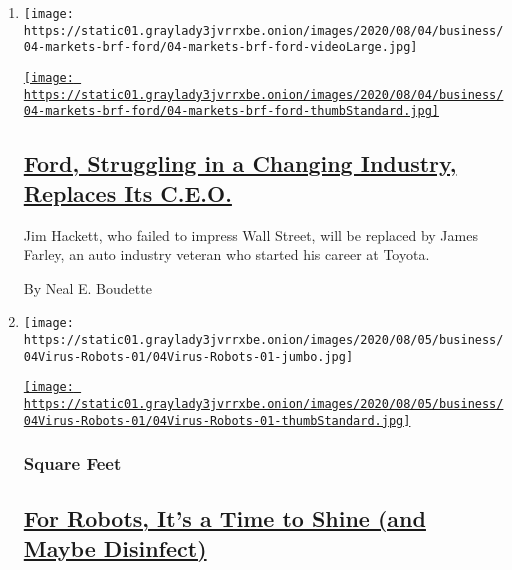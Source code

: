 \begin{enumerate}
\def\labelenumi{\arabic{enumi}.}
\item
  \texttt{[image: https://static01.graylady3jvrrxbe.onion/images/2020/08/04/business/04-markets-brf-ford/04-markets-brf-ford-videoLarge.jpg]}

  \href{/2020/08/04/business/ford-jim-hackett-james-farley.html}{\texttt{[image: https://static01.graylady3jvrrxbe.onion/images/2020/08/04/business/04-markets-brf-ford/04-markets-brf-ford-thumbStandard.jpg]}}

  \hypertarget{ford-struggling-in-a-changing-industry-replaces-its-ceo}{%
  \subsection{\texorpdfstring{\href{/2020/08/04/business/ford-jim-hackett-james-farley.html}{Ford,
  Struggling in a Changing Industry, Replaces Its
  C.E.O.}}{Ford, Struggling in a Changing Industry, Replaces Its C.E.O.}}\label{ford-struggling-in-a-changing-industry-replaces-its-ceo}}

  Jim Hackett, who failed to impress Wall Street, will be replaced by
  James Farley, an auto industry veteran who started his career at
  Toyota.

  By Neal E. Boudette
\item
  \texttt{[image: https://static01.graylady3jvrrxbe.onion/images/2020/08/05/business/04Virus-Robots-01/04Virus-Robots-01-jumbo.jpg]}

  \href{/2020/08/04/business/robot-cleaning-coronavirus.html}{\texttt{[image: https://static01.graylady3jvrrxbe.onion/images/2020/08/05/business/04Virus-Robots-01/04Virus-Robots-01-thumbStandard.jpg]}}

  \hypertarget{square-feet}{%
  \subsubsection{Square Feet}\label{square-feet}}

  \hypertarget{for-robots-its-a-time-to-shine-and-maybe-disinfect}{%
  \subsection{\texorpdfstring{\href{/2020/08/04/business/robot-cleaning-coronavirus.html}{For
  Robots, It's a Time to Shine (and Maybe
  Disinfect)}}{For Robots, It's a Time to Shine (and Maybe Disinfect)}}\label{for-robots-its-a-time-to-shine-and-maybe-disinfect}}


\end{enumerate}
